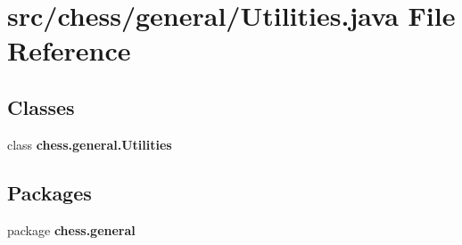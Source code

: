 \section{src/chess/general/\+Utilities.java File Reference}
\label{_utilities_8java}
\subsection*{Classes}
\begin{DoxyCompactItemize}
\item 
class {\bf chess.\+general.\+Utilities}
\end{DoxyCompactItemize}
\subsection*{Packages}
\begin{DoxyCompactItemize}
\item 
package {\bf chess.\+general}
\end{DoxyCompactItemize}

